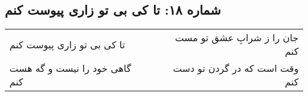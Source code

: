 \begin{center}
\section*{شماره ۱۸: تا کی بی تو زاری پیوست کنم}
\label{sec:018}
\begin{longtable}{l p{0.5cm} r}
تا کی بی تو زاری پیوست کنم
&&
جان را ز شرابِ عشق تو مست کنم
\\
گاهی خود را نیست و گه هست کنم
&&
وقت است که در گردن تو دست کنم
\\
\end{longtable}
\end{center}
